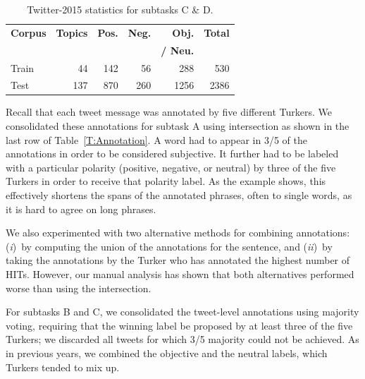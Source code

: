 \documentclass[11pt]{article}
\begin{document}
\begin{table}[t]
\small
\begin{center}
\begin{tabular}{l r r r r r}
\hline
\multicolumn{1}{c}{\bf Corpus} & \bf Topics & \bf Pos. & \bf Neg. & \bf Obj. & \bf Total\\
 &  & &  & \bf / Neu. & \\
\hline
Train & 44 & 142 & 56 & 288 & 530 \\
Test & 137 & 870 & 260 & 1256 & 2386 \\
\hline
\end{tabular}
\caption{Twitter-2015 statistics for subtasks C \& D.}
\label{T:CorpusStatsC}
\end{center}
\end{table}

Recall that each tweet message was annotated by five different Turkers.
We consolidated these annotations for subtask A 
using intersection as shown in the last row of Table~\ref{T:Annotation}.
A word had to appear in 3/5 of the annotations in order to be considered subjective.
It further had to be labeled with a particular polarity (positive, negative, or neutral) by three of the five Turkers in order to receive that polarity label.
As the example shows, this effectively shortens the spans of the annotated phrases,
often to single words, as it is hard to agree on long phrases.

We also experimented with two alternative methods for combining annotations:
({\it i})~by computing the union of the annotations for the sentence,
and ({\it ii})~by taking the annotations by the Turker who has annotated the highest number of HITs.
However, our manual analysis has shown that both alternatives performed worse than using the intersection.

For subtasks B and C, we consolidated the tweet-level annotations using majority voting,
requiring that the winning label be proposed by at least three of the five Turkers;
we discarded all tweets for which 3/5 majority could not be achieved.
As in previous years,
we combined the objective and the neutral labels, which Turkers tended to mix up. 

\end{document}
